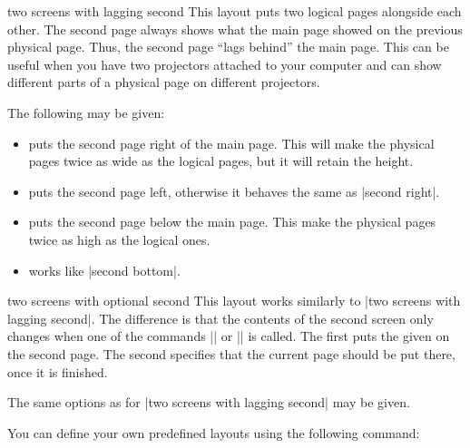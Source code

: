 \begin{pgflayout}{two screens with lagging second}
    This layout puts two logical pages alongside each other. The second page
    always shows what the main page showed on the previous physical page. Thus,
    the second page ``lags behind'' the main page. This can be useful when you
    have two projectors attached to your computer and can show different parts
    of a physical page on different projectors.

    The following  may be given:
    \begin{itemize}
        \item {} puts the second page right of the main
            page. This will make the physical pages twice as wide as the
            logical pages, but it will retain the height.
        \item {} puts the second page left, otherwise it
            behaves the same as |second right|.
        \item {} puts the second page below the main
            page. This make the physical pages twice as high as the logical
            ones.
        \item {} works like |second bottom|.
    \end{itemize}
\end{pgflayout}

\begin{pgflayout}{two screens with optional second}
    This layout works similarly to |two screens with lagging second|. The
    difference is that the contents of the second screen only changes when one
    of the commands || or
    || is called. The first puts the given
     on the second page. The second specifies that the current page
    should be put there, once it is finished.

    The same options as for |two screens with lagging second| may be given.
\end{pgflayout}

You can define your own predefined layouts using the following command:

